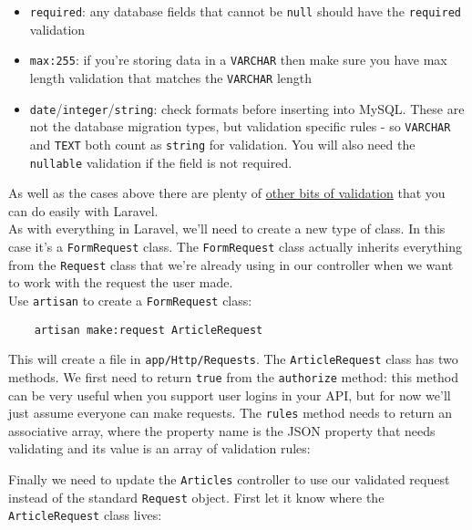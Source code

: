 \begin{itemize}
    \item \texttt{required}: any database fields that cannot be \texttt{null} should have the \texttt{required} validation
    \item \texttt{max:255}: if you're storing data in a \texttt{VARCHAR} then make sure you have max length validation that matches the \texttt{VARCHAR} length
    \item \texttt{date}/\texttt{integer}/\texttt{string}: check formats before inserting into MySQL. These are not the database migration types, but validation specific rules - so \texttt{VARCHAR} and \texttt{TEXT} both count as \texttt{string} for validation. You will also need the \texttt{nullable} validation if the field is not required.
\end{itemize}

As well as the cases above there are plenty of \href{http://laravel.com/docs/master/validation#available-validation-rules}{other bits of validation} that you can do easily with Laravel.
\\

As with everything in Laravel, we'll need to create a new type of class. In this case it's a \texttt{FormRequest} class. The \texttt{FormRequest} class actually inherits everything from the \texttt{Request} class that we're already using in our controller when we want to work with the request the user made.
\\

Use \texttt{artisan} to create a \texttt{FormRequest} class:

\begin{verbatim}
    artisan make:request ArticleRequest
\end{verbatim}

This will create a file in \texttt{app/Http/Requests}. The \texttt{ArticleRequest} class has two methods. We first need to return \texttt{true} from the \texttt{authorize} method: this method can be very useful when you support user logins in your API, but for now we'll just assume everyone can make requests. The \texttt{rules} method needs to return an associative array, where the property name is the JSON property that needs validating and its value is an array of validation rules:



Finally we need to  update the \texttt{Articles} controller to use our validated request instead of the standard \texttt{Request} object. First let it know where the \texttt{ArticleRequest} class lives:

